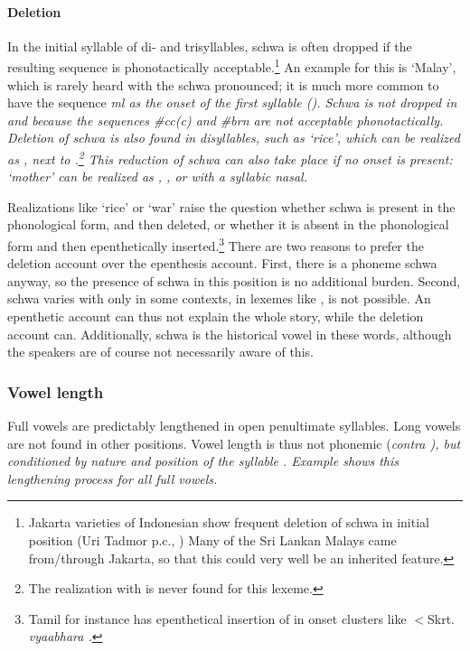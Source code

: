 \paragraph{Deletion}\label{sec:phon:schwa:deletion}
In the initial syllable of di- and trisyllables, schwa is often dropped if the resulting sequence is phonotactically acceptable.\footnote{Jakarta varieties of Indonesian show frequent deletion of schwa in initial position (Uri Tadmor p.c., \citet[229]{Ewing2005}) Many of the Sri Lankan Malays came from/through Jakarta, so that this could very well be an inherited feature.} An example for this is  `Malay', which is rarely heard with the schwa pronounced; it is much more common to have the sequence \em ml \em as the onset of the first syllable (). Schwa is not dropped in  and  because the sequences \em \#cc(c\textipa{:}) \em and \em \#brn \em are not acceptable phonotactically. Deletion of schwa is also found in disyllables,  such as `rice', which can be realized as , next to .\footnote{The realization with  is never found for this lexeme.} This reduction of schwa can also take place if no onset is present: `mother' can be realized as , , or   with a syllabic nasal.

Realizations like `rice' or `war' raise the question whether schwa is present in the phonological form, and then deleted, or whether it is absent in the phonological form and then  epenthetically inserted.\footnote{Tamil for instance has epenthetical insertion of  in onset clusters like $<$Skrt. \em vyaabhara \em \citep[103]{AnnamalaiEtAl1998}.} There are two reasons to prefer the deletion account over the epenthesis account. First, there is a phoneme schwa anyway, so the presence of schwa in this position is no additional burden. Second, schwa varies with \zero{} only in some contexts, in lexemes like , \zero{} is not possible. An epenthetic account can thus not explain the whole story, while the deletion account can. Additionally, schwa is the historical vowel in these words, although the speakers are of course not necessarily aware of this.



\subsubsection{Vowel length}\label{sec:phon:Vowellength}
Full vowels are predictably lengthened in open penultimate syllables.  Long vowels are not found in other positions. Vowel length is thus not phonemic (\em contra \em \citet{Bichsel, SmithEtAl2004}), but conditioned by nature and position of the syllable \citep[cf.][]{Tapovanaye1995}. Example  shows this lengthening process for all full vowels.


